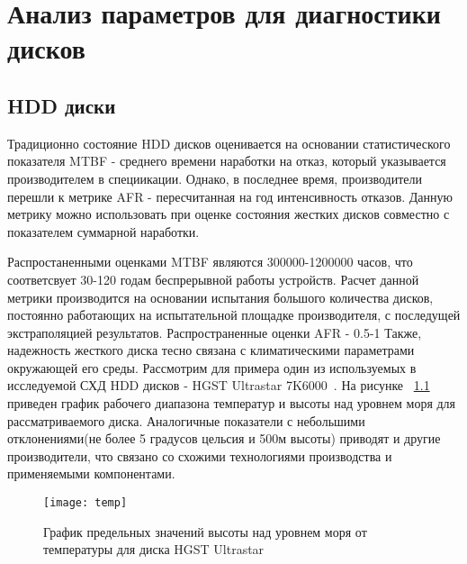 
\begingroup
\renewcommand{\cleardoublepage}{}
\renewcommand{\clearpage}{}
\vspace{1em}
\chapter{Анализ параметров для диагностики дисков}
\endgroup

\section{HDD диски}
Традиционно состояние HDD дисков оценивается на основании статистического показателя MTBF - среднего времени наработки на отказ, который указывается производителем в специикации. Однако, в последнее время, производители перешли к метрике AFR - пересчитанная на год интенсивность отказов. Данную метрику можно использовать при оценке состояния жестких дисков совместно с показателем суммарной наработки.  

Распростаненными оценками MTBF являются 300000-1200000 часов, что соответсвует 30-120 годам беспрерывной работы устройств. Расчет данной метрики производится на основании испытания большого количества дисков, постоянно работающих на испытательной площадке производителя, с последущей экстраполяцией результатов. 
Распространенные оценки AFR - 0.5-1%
Также, надежность жесткого диска тесно связана с климатическими параметрами окружающей его среды. 
Рассмотрим для примера один из используемых в исследуемой СХД HDD дисков - HGST Ultrastar 7K6000~\cite{HGST}. На рисунке ~\ref{fig:temp} приведен график рабочего диапазона температур и высоты над уровнем моря для рассматриваемого диска. Аналогичные показатели с небольшими отклонениями(не более 5 градусов цельсия и 500м высоты) приводят и другие производители, что связано со схожими технологиями производства и применяемыми компонентами. 

\begin{figure}[!h]
	\centering
	\texttt{[image: temp]}
	\caption{График предельных значений высоты над уровнем моря от температуры для диска HGST Ultrastar}
	\label{fig:temp}
\end{figure}

